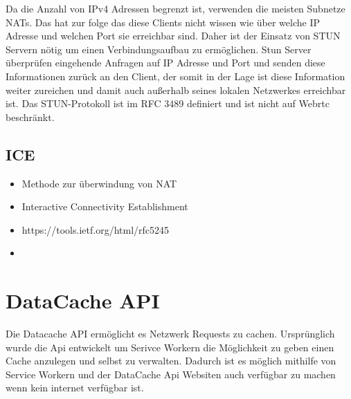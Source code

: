 Da die Anzahl von IPv4 Adressen begrenzt ist, verwenden die meisten Subnetze NATs. Das hat zur folge das diese Clients nicht wissen wie über welche IP Adresse und welchen Port sie erreichbar sind. Daher ist der Einsatz von STUN Servern nötig um einen Verbindungsaufbau zu ermöglichen. Stun Server überprüfen eingehende Anfragen auf IP Adresse und Port und senden diese Informationen zurück an den Client, der somit in der Lage ist diese Information weiter zureichen und damit auch außerhalb seines lokalen Netzwerkes erreichbar ist. Das STUN-Protokoll ist im RFC 3489 \cite{rfcStun} definiert und ist nicht auf Webrtc beschränkt.


%
%

\subsection{ICE}

\begin{itemize}
	\item Methode zur überwindung von NAT
	\item Interactive Connectivity Establishment
	\item https://tools.ietf.org/html/rfc5245
	\item 
\end{itemize}

\section{DataCache API}

Die Datacache API ermöglicht es Netzwerk Requests zu cachen. Ursprünglich wurde die Api entwickelt um Serivce Workern die Möglichkeit zu geben einen Cache anzulegen und selbst zu verwalten. Dadurch ist es möglich mithilfe von Service Workern und der DataCache Api Websiten auch verfügbar zu machen wenn kein internet verfügbar ist. 

